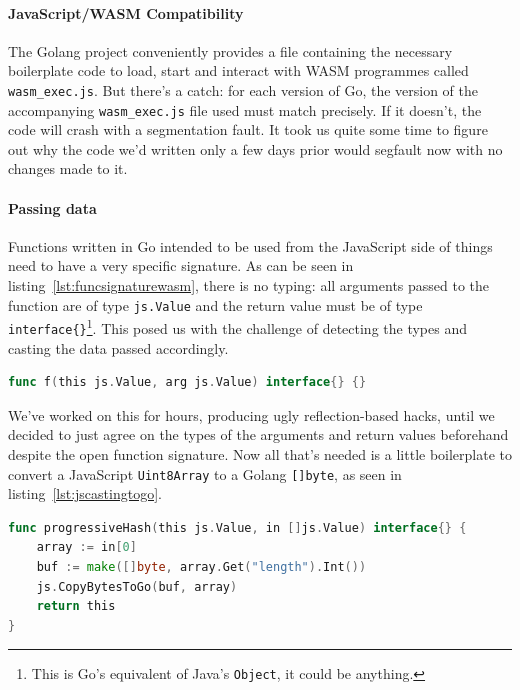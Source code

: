 \paragraph{JavaScript/WASM Compatibility} The Golang project conveniently provides a file containing the necessary boilerplate code to load, start and interact with \gls{WASM} programmes called \texttt{wasm\_exec.js}.
But there's a catch: for each version of Go, the version of the accompanying \texttt{wasm\_exec.js} file used must match precisely.
If it doesn't, the code will crash with a segmentation fault.
It took us quite some time to figure out why the code we'd written only a few days prior would segfault now with no changes made to it.

\paragraph{Passing data} Functions written in Go intended to be used from the JavaScript side of things need to have a very specific signature.
As can be seen in listing~\ref{lst:funcsignaturewasm}, there is no typing: all arguments passed to the function are of type \texttt{js.Value} and the return value must be of type \texttt{interface\{\}}\footnote{This is Go's equivalent of Java's \texttt{Object}, it could be anything.}.
This posed us with the challenge of detecting the types and casting the data passed accordingly.

\begin{lstlisting}[caption={Golang WASM function signature}, captionpos=b, language=Go, label={lst:funcsignaturewasm}]
    func f(this js.Value, arg js.Value) interface{} {}
\end{lstlisting}

We've worked on this for hours, producing ugly reflection-based hacks, until we decided to just agree on the types of the arguments and return values beforehand despite the open function signature.
Now all that's needed is a little boilerplate to convert a JavaScript \texttt{Uint8Array} to a Golang \texttt{[]byte}, as seen in listing~\ref{lst:jscastingtogo}.

\begin{lstlisting}[caption={Uint8Array to {[]}byte}, captionpos=b, language=Go, label={lst:jscastingtogo}, captionpos=b]
func progressiveHash(this js.Value, in []js.Value) interface{} {
    array := in[0]
    buf := make([]byte, array.Get("length").Int())
    js.CopyBytesToGo(buf, array)
    return this
}
\end{lstlisting}

